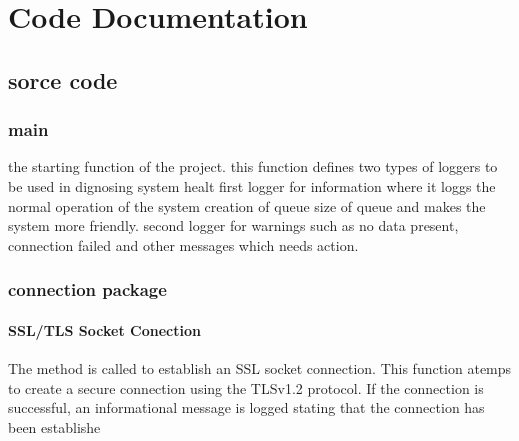 \documentclass[letterpaper,10pt,english]{sphinxmanual}
\begin{document}
\sphinxstepscope


\chapter{Code Documentation}
\label{\detokenize{codedoc:code-documentation}}\label{\detokenize{codedoc::doc}}

\section{sorce code}
\label{\detokenize{codedoc:sorce-code}}
\sphinxstepscope


\subsection{main}
\label{\detokenize{main:module-main}}\label{\detokenize{main:main}}\label{\detokenize{main::doc}}

\begin{fulllineitems}
\label{\detokenize{main:main.main}}
\pysigstartsignatures
{}
\pysigstopsignatures
\sphinxAtStartPar
the starting function of the project.
this function defines two types of loggers to be used in dignosing system healt 
first logger for information where it loggs the normal operation of the system creation of queue size of queue
and makes the system more friendly.
second logger for warnings such as no data present, connection failed and other messages which needs action.

\end{fulllineitems}


\sphinxstepscope


\subsection{connection package}
\label{\detokenize{connection:connection-package}}\label{\detokenize{connection::doc}}

\subsubsection{SSL/TLS Socket Conection}
\label{\detokenize{connection:ssl-tls-socket-conection}}
\sphinxAtStartPar
The method  is called to establish an SSL socket connection.
This function atemps to create a secure connection using the TLSv1.2 protocol.
If the connection is successful, an informational message is logged stating that the connection has been establishe
\end{document}
